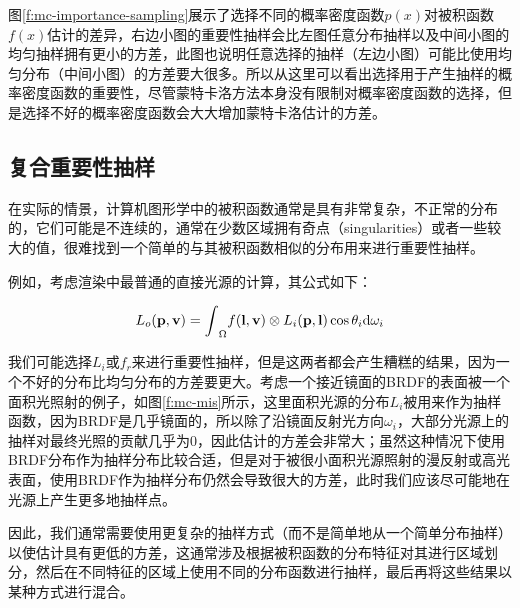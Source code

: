 图\ref{f:mc-importance-sampling}展示了选择不同的概率密度函数$p(x)$对被积函数$f(x)$估计的差异，右边小图的重要性抽样会比左图任意分布抽样以及中间小图的均匀抽样拥有更小的方差，此图也说明任意选择的抽样（左边小图）可能比使用均匀分布（中间小图）的方差要大很多。所以从这里可以看出选择用于产生抽样的概率密度函数的重要性，尽管蒙特卡洛方法本身没有限制对概率密度函数的选择，但是选择不好的概率密度函数会大大增加蒙特卡洛估计的方差。





\subsection{复合重要性抽样}\label{sec:mc-mis}
在实际的情景，计算机图形学中的被积函数通常是具有非常复杂，不正常的分布的，它们可能是不连续的，通常在少数区域拥有奇点（singularities）或者一些较大的值，很难找到一个简单的与其被积函数相似的分布用来进行重要性抽样。

例如，考虑渲染中最普通的直接光源的计算，其公式如下：

\begin{equation}
	L_o(\mathbf{p},\mathbf{v})={\rm \int}_{\Omega}f(\mathbf{l},\mathbf{v})\otimes L_i(\mathbf{p},\mathbf{l})\cos\theta_i {\rm d}\omega_i
\end{equation}

\noindent 我们可能选择$L_i$或$f_r$来进行重要性抽样，但是这两者都会产生糟糕的结果，因为一个不好的分布比均匀分布的方差要更大。考虑一个接近镜面的BRDF的表面被一个面积光照射的例子，如图\ref{f:mc-mis}所示，这里面积光源的分布$L_i$被用来作为抽样函数，因为BRDF是几乎镜面的，所以除了沿镜面反射光方向$\omega_i$，大部分光源上的抽样对最终光照的贡献几乎为0，因此估计的方差会非常大；虽然这种情况下使用BRDF分布作为抽样分布比较合适，但是对于被很小面积光源照射的漫反射或高光表面，使用BRDF作为抽样分布仍然会导致很大的方差，此时我们应该尽可能地在光源上产生更多地抽样点。

因此，我们通常需要使用更复杂的抽样方式（而不是简单地从一个简单分布抽样）以使估计具有更低的方差，这通常涉及根据被积函数的分布特征对其进行区域划分，然后在不同特征的区域上使用不同的分布函数进行抽样，最后再将这些结果以某种方式进行混合。

